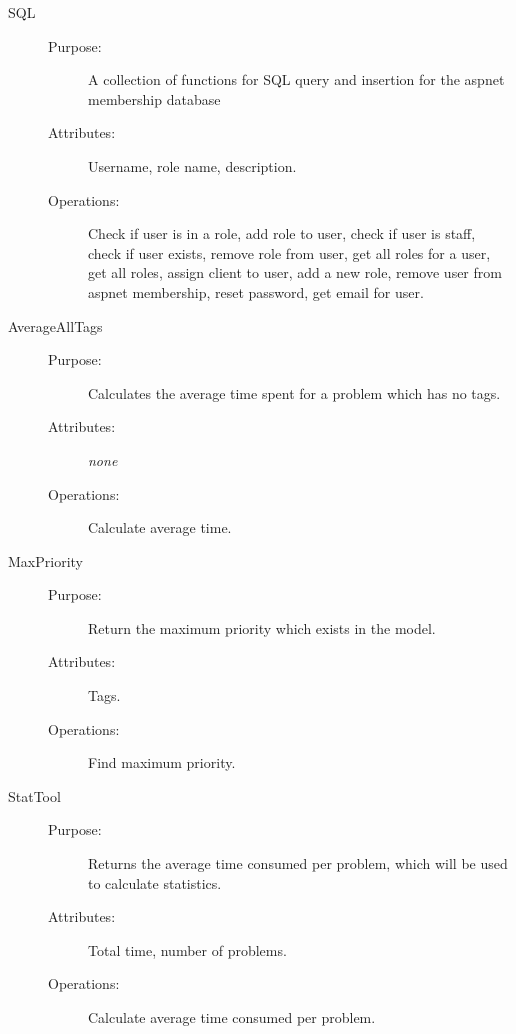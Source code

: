 \begin{description}
\item[SQL]\hfill
\begin{description}
\item[Purpose:]A collection of functions for SQL query and insertion for the aspnet membership database
\item[Attributes:]Username, role name, description.
\item[Operations:]Check if user is in a role, add role to user, check if user is staff, check if user exists, remove role from user, get all roles for a user, get all roles, assign client to user, add a new role, remove user from aspnet membership, reset password, get email for user.
\end{description}
\end{description}

\begin{description}
\item[AverageAllTags]\hfill
\begin{description}
\item[Purpose:]Calculates the average time spent for a problem which has no tags.
\item[Attributes:]\textit{none}
\item[Operations:]Calculate average time.
\end{description}
\end{description}

\begin{description}
\item[MaxPriority]\hfill
\begin{description}
\item[Purpose:] Return the maximum priority which exists in the model.
\item[Attributes:]Tags.
\item[Operations:]Find maximum priority.
\end{description}
\end{description}

\begin{description}
\item[StatTool]\hfill
\begin{description}
\item[Purpose:] Returns the average time consumed per problem, which will be used to calculate statistics.
\item[Attributes:]Total time, number of problems.
\item[Operations:]Calculate average time consumed per problem.
\end{description}
\end{description}
